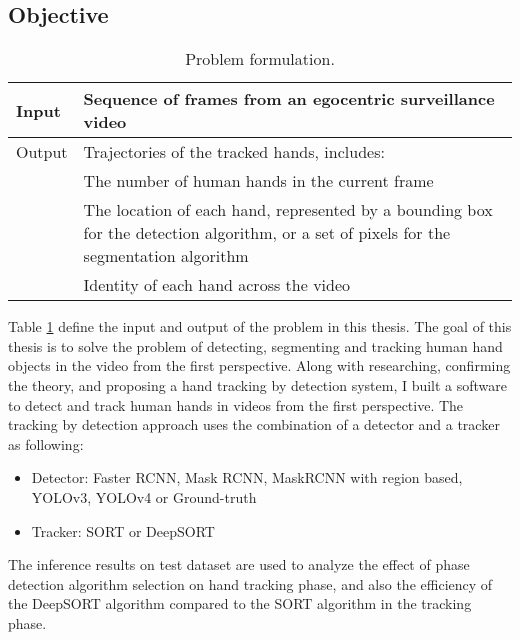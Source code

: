 \subsection{Objective}
\begin{table}
	\label{formulation}
	\begin{tabular}{|l|p{13cm}|}
		
		\hline 
		Input &  Sequence of frames from an egocentric surveillance video\\ 
		\hline 
		Output & Trajectories of the tracked hands, includes: \\
		& \tabitem The number of human hands in the current frame \\
		& \tabitem The location of each hand, represented by a bounding box for the detection algorithm, or a set of pixels for the segmentation algorithm \\
		& \tabitem Identity of each hand across the video
\\ 
		\hline 
	\end{tabular}
	\caption{Problem formulation.}
\end{table}
Table \ref{formulation} define the input and output of the problem in this thesis. The goal of this thesis is to solve the problem of detecting, segmenting and tracking human hand objects in the video from the first perspective. Along with researching, confirming the theory, and proposing a hand tracking by detection system, I built a software to detect and track human hands in videos from the first perspective. The tracking by detection approach uses the combination of a detector and a tracker as following:
\begin{itemize}
	\item Detector: Faster RCNN, Mask RCNN, MaskRCNN with region based, YOLOv3, YOLOv4 or Ground-truth
	\item Tracker: SORT or DeepSORT
\end{itemize}
The inference results on test dataset are used to analyze the effect of phase detection algorithm selection on hand tracking phase, and also the efficiency of the DeepSORT algorithm compared to the SORT algorithm in the tracking phase.

